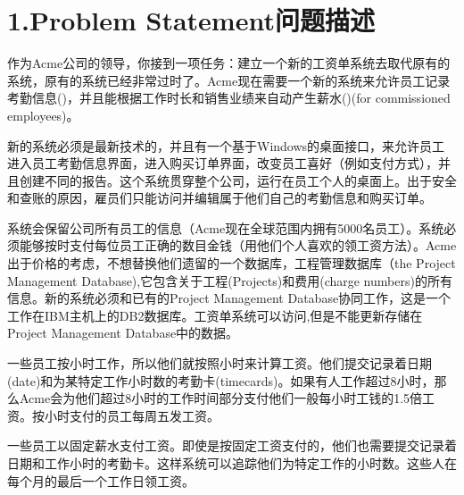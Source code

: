 \documentclass{article}
\begin{document}
\mdxtitleblockstart{}
\mdxauthorstart{}

\mdxauthorend
\mdtitleauthorrunning{}{}\mdxtitleblockend%

\section{1.\hspace*{0.5em}Problem Statement问题描述}\label{sec-problem-statement}%

\noindent{}作为Acme公司的领导，你接到一项任务：建立一个新的工资单系统去取代原有的系统，原有的系统已经非常过时了。Acme现在需要一个新的系统来允许员工记录考勤信息()，并且能根据工作时长和销售业绩来自动产生薪水()(for commissioned employees)。%

新的系统必须是最新技术的，并且有一个基于Windows的桌面接口，来允许员工进入员工考勤信息界面，进入购买订单界面，改变员工喜好（例如支付方式），并且创建不同的报告。这个系统贯穿整个公司，运行在员工个人的桌面上。出于安全和查账的原因，雇员们只能访问并编辑属于他们自己的考勤信息和购买订单。%

系统会保留公司所有员工的信息（Acme现在全球范围内拥有5000名员工）。系统必须能够按时支付每位员工正确的数目金钱（用他们个人喜欢的领工资方法）。Acme出于价格的考虑，不想替换他们遗留的一个数据库，工程管理数据库（the Project Management Database),它包含关于工程(Projects)和费用(charge numbers)的所有信息。新的系统必须和已有的Project Management Database协同工作，这是一个工作在IBM主机上的DB2数据库。工资单系统可以访问,但是不能更新存储在Project Management Database中的数据。%

一些员工按小时工作，所以他们就按照小时来计算工资。他们提交记录着日期(date)和为某特定工作小时数的考勤卡(timecards)。如果有人工作超过8小时，那么Acme会为他们超过8小时的工作时间部分支付他们一般每小时工钱的1.5倍工资。按小时支付的员工每周五发工资。%

一些员工以固定薪水支付工资。即使是按固定工资支付的，他们也需要提交记录着日期和工作小时的考勤卡。这样系统可以追踪他们为特定工作的小时数。这些人在每个月的最后一个工作日领工资。%
\end{document}
